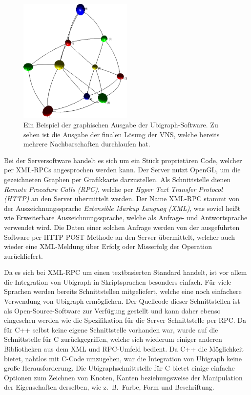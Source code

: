 \begin{figure}
\centering
\includegraphics[width=0.5\textwidth]{img/ubigraph.png}
\caption[Ein Beispiel der graphischen Ausgabe der Ubigraph-Software]{Ein Beispiel der graphischen Ausgabe der Ubigraph-Software. Zu sehen ist die Ausgabe der finalen Lösung der VNS, welche bereits mehrere Nachbarschaften durchlaufen hat.}
\label{img:ubigraph}
\end{figure}
Bei der Serversoftware handelt es sich um ein Stück proprietären Code, welcher per XML-RPCs angesprochen werden kann. Der Server nutzt OpenGL, um die gezeichneten Graphen per Grafikkarte darzustellen. Als
Schnittstelle dienen \textit{Remote Procedure Calls (RPC)}, welche per \textit{Hyper Text Transfer Protocol (HTTP)} an den Server übermittelt werden. Der Name XML-RPC stammt von der Auszeichnungssprache
\textit{Extensible Markup Languag (XML)}, was soviel heißt wie Erweiterbare Auszeichnungssprache, welche als Anfrage- und Antwortsprache verwendet wird. Die Daten einer solchen Anfrage werden von der
ausgeführten Software per HTTP-POST-Methode an den Server übermittelt, welcher auch wieder eine XML-Meldung über Erfolg oder Misserfolg der Operation zurückliefert. 

Da es sich bei XML-RPC um einen textbasierten Standard handelt, ist vor allem die Integration von Ubigraph in Skriptsprachen besonders einfach. Für viele Sprachen werden bereits Schnittstellen mitgeliefert,
welche eine noch einfachere Verwendung von Ubigraph ermöglichen. Der Quellcode dieser Schnittstellen ist als Open-Source-Software zur Verfügung gestellt und kann daher ebenso eingesehen werden wie die
Spezifikation für die Server-Schnittstelle per RPC\@. Da für C++ selbst keine eigene Schnittstelle vorhanden war, wurde auf die Schnittstelle für C zurückgegriffen, welche sich wiederum einiger anderen Bibliotheken
aus dem XML und RPC-Umfeld bedient. Da C++ die Möglichkeit bietet, nahtlos mit C-Code umzugehen, war die Integration von Ubigraph keine große Herausforderung. Die Ubigraphschnittstelle für C bietet einige
einfache Optionen zum Zeichnen von Knoten, Kanten beziehungsweise der Manipulation der Eigenschaften derselben, wie z.~B.\ Farbe, Form und Beschriftung.
